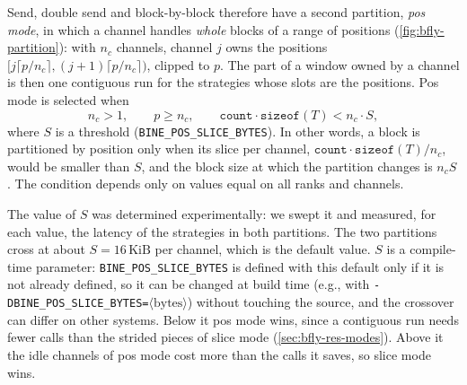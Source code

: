 Send, double send and block-by-block therefore have a second partition, \emph{pos mode}, in which a channel handles \emph{whole} blocks of a range of positions (\cref{fig:bfly-partition}): with $n_c$ channels, channel $j$ owns the positions $[j\lceil p/n_c\rceil,(j+1)\lceil p/n_c\rceil)$, clipped to $p$.
The part of a window owned by a channel is then one contiguous run for the strategies whose slots are the positions.
Pos mode is selected when
\begin{equation}
  n_c>1,\qquad p\ge n_c,\qquad \texttt{count}\cdot\texttt{sizeof}(T)<n_c\cdot S,
  \label{eq:bfly-pos}
\end{equation}
where $S$ is a threshold (\texttt{BINE\_POS\_SLICE\_BYTES}).
In other words, a block is partitioned by position only when its slice per channel, $\texttt{count}\cdot\texttt{sizeof}(T)/n_c$, would be smaller than $S$, and the block size at which the partition changes is $n_c S$.
The condition depends only on values equal on all ranks and channels.

The value of $S$ was determined experimentally: we swept it and measured, for each value, the latency of the strategies in both partitions.
The two partitions cross at about $S=16\,\text{KiB}$ per channel, which is the default value.
$S$ is a compile-time parameter: \texttt{BINE\_POS\_SLICE\_BYTES} is defined with this default only if it is not already defined, so it can be changed at build time (e.g., with \texttt{-DBINE\_POS\_SLICE\_BYTES=}$\langle\text{bytes}\rangle$) without touching the source, and the crossover can differ on other systems.
Below it pos mode wins, since a contiguous run needs fewer calls than the strided pieces of slice mode (\cref{sec:bfly-res-modes}). Above it the idle channels of pos mode cost more than the calls it saves, so slice mode wins.

